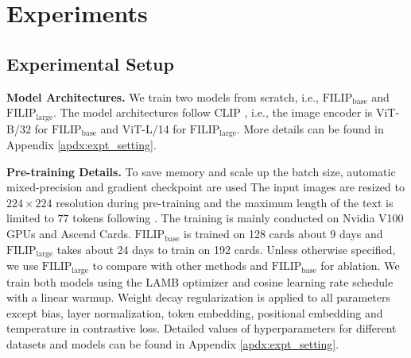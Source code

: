 \vspace{-1mm}
\section{Experiments}
\label{sec:expt}

\vspace{-1mm}
\subsection{Experimental Setup}
\label{sec:experiment_details}
\textbf{Model Architectures.}
We train two 
models from scratch, i.e., $\text{FILIP}_{\text{base}}$ and $\text{FILIP}_{\text{large}}$. 
The model architectures follow
CLIP \citep{radford2021learning}, i.e., the image encoder is ViT-B/32 for $\text{FILIP}_{\text{base}}$ and ViT-L/14 for $\text{FILIP}_{\text{large}}$. More details can be found in Appendix \ref{apdx:expt_setting}.

\textbf{Pre-training Details.}
To save memory and scale up the batch size, automatic mixed-precision \citep{micikevicius2018mixed} and gradient checkpoint \citep{griewank2000algorithm, chen2016training} are used
The input images are resized to $224 \times 224$ resolution during pre-training and the maximum length of the text is limited to $77$ tokens following \citet{radford2021learning}.
The training is mainly conducted on Nvidia V100 GPUs and Ascend Cards.
$\text{FILIP}_{\text{base}}$ is trained on 128 cards about 9 days and $\text{FILIP}_{\text{large}}$ takes about 24 days to train on 192 cards. 
Unless otherwise specified, we use $\text{FILIP}_{\text{large}}$ to compare with other methods and $\text{FILIP}_{\text{base}}$ for ablation.
We train both models using the LAMB optimizer \citep{2019Large} and cosine learning rate schedule \citep{2016SGDR} with a linear warmup. 
Weight decay regularization is applied to all parameters except bias, layer normalization, token embedding, positional embedding and temperature in contrastive loss. 
Detailed values of hyperparameters for different datasets and models can be found in Appendix \ref{apdx:expt_setting}.


